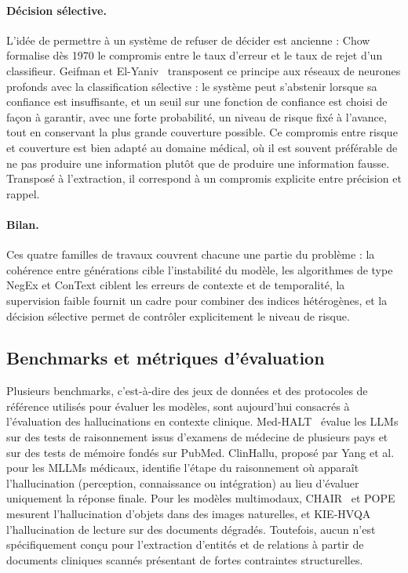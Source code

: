 \paragraph{Décision sélective.}
L'idée de permettre à un système de refuser de décider est ancienne : Chow~\cite{chow1970reject} formalise dès 1970 le compromis entre le taux d'erreur et le taux de rejet d'un classifieur. Geifman et El-Yaniv~\cite{geifman2017selective} transposent ce principe aux réseaux de neurones profonds avec la classification sélective : le système peut s'abstenir lorsque sa confiance est insuffisante, et un seuil sur une fonction de confiance est choisi de façon à garantir, avec une forte probabilité, un niveau de risque fixé à l'avance, tout en conservant la plus grande couverture possible. Ce compromis entre risque et couverture est bien adapté au domaine médical, où il est souvent préférable de ne pas produire une information plutôt que de produire une information fausse. Transposé à l'extraction, il correspond à un compromis explicite entre précision et rappel.

\paragraph{Bilan.}
Ces quatre familles de travaux couvrent chacune une partie du problème : la cohérence entre générations cible l'instabilité du modèle, les algorithmes de type NegEx et ConText ciblent les erreurs de contexte et de temporalité, la supervision faible fournit un cadre pour combiner des indices hétérogènes, et la décision sélective permet de contrôler explicitement le niveau de risque.

\subsection{Benchmarks et métriques d'évaluation}

Plusieurs benchmarks, c'est-à-dire des jeux de données et des protocoles de référence utilisés pour évaluer les modèles, sont aujourd'hui consacrés à l'évaluation des hallucinations en contexte clinique. Med-HALT~\cite{pal2023medhalt} évalue les LLMs sur des tests de raisonnement issus d'examens de médecine de plusieurs pays et sur des tests de mémoire fondés sur PubMed. ClinHallu, proposé par Yang et al.~\cite{yang2026clinhallu} pour les MLLMs médicaux, identifie l'étape du raisonnement où apparaît l'hallucination (perception, connaissance ou intégration) au lieu d'évaluer uniquement la réponse finale. Pour les modèles multimodaux, CHAIR~\cite{rohrbach2018chair} et POPE~\cite{li2023pope} mesurent l'hallucination d'objets dans des images naturelles, et KIE-HVQA~\cite{he2025seeing} l'hallucination de lecture sur des documents dégradés. Toutefois, aucun n'est spécifiquement conçu pour l'extraction d'entités et de relations à partir de documents cliniques scannés présentant de fortes contraintes structurelles.

